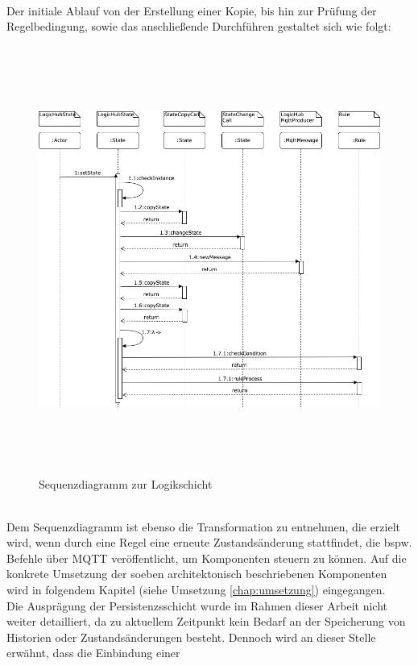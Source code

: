     \\
    Der initiale Ablauf von der Erstellung einer Kopie, bis hin zur Prüfung der Regelbedingung, sowie das anschließende Durchführen gestaltet sich wie folgt: 
    \\
    \pagebreak
    \begin{figure}[hbt!]
        \centering
        \includegraphics[width=14cm,height=14cm,keepaspectratio]{images/Logikschicht_Sequenz_final.png}
        \caption{Sequenzdiagramm zur Logikschicht}
        \label{fig:logiksequenz}
    \end{figure}
    \\
    \linebreak
    Dem Sequenzdiagramm ist ebenso die Transformation zu entnehmen, die erzielt wird, wenn durch eine Regel eine erneute Zustandsänderung stattfindet, die bspw. Befehle über \acs{MQTT} 
    veröffentlicht, um Komponenten steuern zu können. Auf die konkrete Umsetzung der soeben architektonisch beschriebenen Komponenten wird in folgendem Kapitel (siehe Umsetzung \ref{chap:umsetzung}) 
    eingegangen.
    \\
    Die Ausprägung der Persistenzsschicht wurde im Rahmen dieser Arbeit nicht weiter detailliert, da zu aktuellem Zeitpunkt 
    kein Bedarf an der Speicherung von Historien oder Zustandsänderungen besteht. Dennoch wird an dieser Stelle erwähnt, dass die Einbindung einer 
